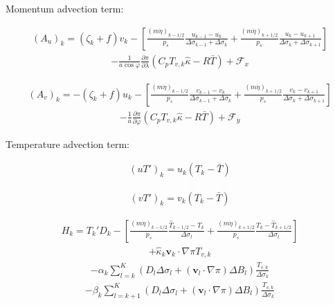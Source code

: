 Momentum advection term:

\begin{eqnarray}
  (A_u)_k
    =  ( \zeta_k + f ) v_k
             - \left[ \frac{(m\dot{\eta})_{k-1/2}}{p_s} \frac{u_{k-1} - u_k}{\Delta\sigma_{k-1}+\Delta\sigma_k}
               + \frac{(m\dot{\eta})_{k+1/2}}{p_s} \frac{u_k   - u_{k+1}}{\Delta\sigma_{k}+\Delta\sigma_{k+1}} \right]
\end{eqnarray} \begin{eqnarray}
           - \frac{1}{a\cos\varphi} \frac{\partial \pi}{\partial \lambda}(C_p T_{v,k}\hat{\kappa}-R\bar{T})
             + {\mathcal F}_x
\end{eqnarray}

\begin{eqnarray}
  (A_v)_k
    =  - ( \zeta_k + f ) u_k
             - \left[ \frac{(m\dot{\eta})_{k-1/2}}{p_s} \frac{v_{k-1} - v_k}{\Delta\sigma_{k-1}+\Delta\sigma_k}
               + \frac{(m\dot{\eta})_{k+1/2}}{p_s} \frac{v_k   - v_{k+1}}{\Delta\sigma_{k}+\Delta\sigma_{k+1}} \right]
\end{eqnarray} \begin{eqnarray}
           - \frac{1}{a} \frac{\partial \pi}{\partial \varphi}(C_p T_{v,k}\hat{\kappa}-R\bar{T})
             + {\mathcal F}_y
\end{eqnarray}

Temperature advection term:

\begin{eqnarray}
 (u T')_k  = u_k (T_k - \bar{T} )
\end{eqnarray}

\begin{eqnarray}
 (v T')_k  = v_k (T_k - \bar{T} )
\end{eqnarray}

\begin{eqnarray}
   H_k =  T_k' D_k
          - \left[ \frac{(m\dot{\eta})_{k-1/2}}{p_s} \frac{\hat{T}_{k-1/2} - T_k}{\Delta \sigma_l}
               + \frac{(m\dot{\eta})_{k+1/2}}{p_s} \frac{T_k - \hat{T}_{k+1/2}}{\Delta \sigma_l} \right]
\end{eqnarray} \begin{eqnarray}
        + \hat{\kappa}_k {\mathbf{v}}_k \cdot \nabla \pi T_{v,k}
\end{eqnarray} \begin{eqnarray}
        - \alpha_k \sum_{l=k}^{K}
                           (D_l \Delta \sigma_l + ({\mathbf{v}}_l \cdot \nabla \pi)\Delta B_l)
                            \frac{T_{v,k}}{\Delta \sigma_k}
\end{eqnarray} \begin{eqnarray}
        - \beta_k \sum_{l=k+1}^{K}
                           (D_l \Delta \sigma_l + ({\mathbf{v}}_l \cdot \nabla \pi)\Delta B_l)
                            \frac{T_{v,k}}{\Delta \sigma_k}
\end{eqnarray}

